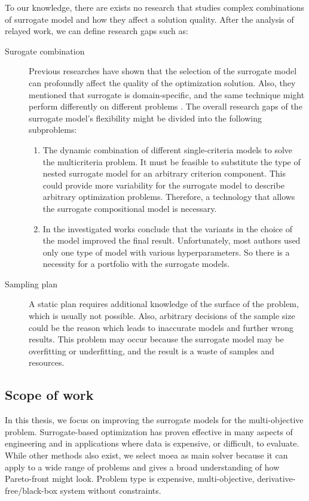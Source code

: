         To our knowledge, there are exists no research that studies complex combinations of surrogate model and how they affect a solution quality. After the analysis of relayed work, we can define research gaps such as:
        \begin{description}
            \item[Surogate combination] Previous researches have shown that the selection of the surrogate model can profoundly affect the quality of the optimization solution. Also, they mentioned that surrogate is domain-specific, and the same technique might perform differently on different problems \cite{LuST19, HybridSurrRCG}. The overall research gaps of the surrogate model's flexibility might be divided into the following subproblems:
            \begin{enumerate}
                \item The dynamic combination of different single-criteria models to solve the multicriteria problem. It must be feasible to substitute the type of nested surrogate model for an arbitrary criterion component. This could provide more variability for the surrogate model to describe arbitrary optimization problems. Therefore, a technology that allows the surrogate compositional model is necessary.
                \item In the investigated works conclude that the variants in the choice of the model improved the final result. Unfortunately, most authors used only one type of model with various hyperparameters. So there is a necessity for a portfolio with the surrogate models.
            \end{enumerate}
            \item[Sampling plan] A static plan requires additional knowledge of the surface of the problem, which is usually not possible. Also, arbitrary decisions of the sample size could be the reason which leads to inaccurate models and further wrong results. This problem may occur because the surrogate model may be overfitting or underfitting, and the result is a waste of samples and resources. 
        \end{description}

        \subsection{Scope of work}
        In this thesis, we focus on improving the surrogate models for the multi-objective problem. Surrogate-based optimization has proven effective in many aspects of engineering and in applications where data is expensive, or difficult, to evaluate. While other methods also exist, we select \gls{moea} as main solver because it can apply to a wide range of problems and gives a broad understanding of how Pareto-front might look. Problem type is expensive, multi-objective, derivative-free/black-box system without constraints.

